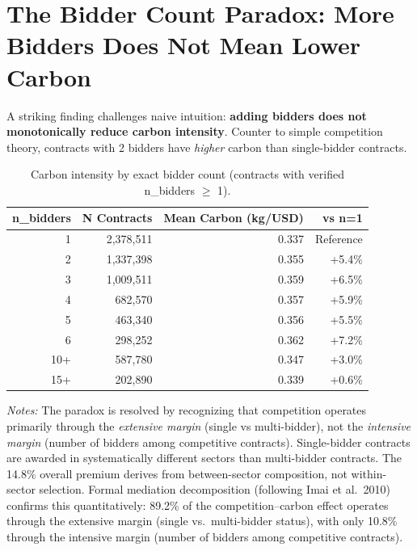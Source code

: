 \documentclass[11pt]{article}
\newcommand{\tabnoteblock}[1]{%
    \par\vspace{0.45em}%
    \begin{minipage}{0.98\linewidth}
    \footnotesize\raggedright #1
    \end{minipage}\par
}
\newcommand{\tabnotes}[1]{\tabnoteblock{\textit{Notes:} #1}}
\begin{document}
\section{The Bidder Count Paradox: More Bidders Does Not Mean Lower Carbon}

A striking finding challenges naive intuition: \textbf{adding bidders does not monotonically reduce carbon intensity}. Counter to simple competition theory, contracts with 2 bidders have \textit{higher} carbon than single-bidder contracts.

\begin{table}[H]
\centering
\caption{Carbon intensity by exact bidder count (contracts with verified n\_bidders $\geq$ 1).}
\label{tab:bidder_paradox}
\begin{tabular}{rrrr}
\toprule
\textbf{n\_bidders} & \textbf{N Contracts} & \textbf{Mean Carbon (kg/USD)} & \textbf{vs n=1} \\
\midrule
1 & 2,378,511 & 0.337 & Reference \\
2 & 1,337,398 & 0.355 & +5.4\% \\
3 & 1,009,511 & 0.359 & +6.5\% \\
4 & 682,570 & 0.357 & +5.9\% \\
5 & 463,340 & 0.356 & +5.5\% \\
6 & 298,252 & 0.362 & +7.2\% \\
10+ & 587,780 & 0.347 & +3.0\% \\
15+ & 202,890 & 0.339 & +0.6\% \\
\bottomrule
\end{tabular}

\tabnotes{The paradox is resolved by recognizing that competition operates primarily through the \textit{extensive margin} (single vs multi-bidder), not the \textit{intensive margin} (number of bidders among competitive contracts). Single-bidder contracts are awarded in systematically different sectors than multi-bidder contracts. The 14.8\% overall premium derives from between-sector composition, not within-sector selection. Formal mediation decomposition (following Imai et al.\ 2010) confirms this quantitatively: 89.2\% of the competition--carbon effect operates through the extensive margin (single vs.\ multi-bidder status), with only 10.8\% through the intensive margin (number of bidders among competitive contracts).
}
\end{table}
\end{document}
